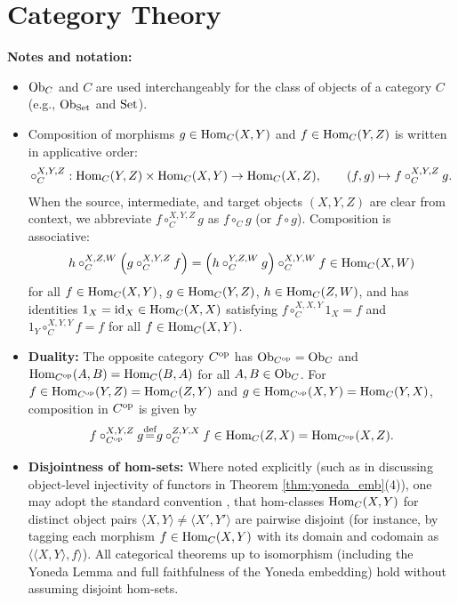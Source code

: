 \documentclass[10pt,a4paper]{article}
\begin{document}
\section{Category Theory}\label{sec:cat_theory}
\noindent\textbf{Notes and notation:}
\begin{itemize}
\item ${\textrm{Ob}}_C$ and $C$ are used interchangeably for the class of objects of a category $C$ (e.g., ${\textrm{Ob}}_{\textrm{Set}}$ and ${\textrm{Set}}$).
\item Composition of morphisms $g \in {\textrm{Hom}}_C(X,Y)$ and $f \in {\textrm{Hom}}_C(Y,Z)$ is written in applicative order:
$$\circ_C^{X,Y,Z} : {\textrm{Hom}}_C(Y,Z) \times {\textrm{Hom}}_C(X,Y) \to {\textrm{Hom}}_C(X,Z), \qquad (f, g) \mapsto f \circ_C^{X,Y,Z} g.$$
When the source, intermediate, and target objects $(X, Y, Z)$ are clear from context, we abbreviate $f \circ_C^{X,Y,Z} g$ as $f \circ_C g$ (or $f \circ g$). Composition is associative:
$$h \circ_C^{X,Z,W} \left(g \circ_C^{X,Y,Z} f\right) = \left(h \circ_C^{Y,Z,W} g\right) \circ_C^{X,Y,W} f \in {\textrm{Hom}}_C(X,W)$$
for all $f \in {\textrm{Hom}}_C(X,Y)$, $g \in {\textrm{Hom}}_C(Y,Z)$, $h \in {\textrm{Hom}}_C(Z,W)$, and has identities $1_X = {\textrm{id}}_X \in {\textrm{Hom}}_C(X,X)$ satisfying $f \circ_C^{X,X,Y} 1_X = f$ and $1_Y \circ_C^{X,Y,Y} f = f$ for all $f \in {\textrm{Hom}}_C(X,Y)$.
\item \textbf{Duality:} The opposite category $C^{\textrm{op}}$ has ${\textrm{Ob}}_{C^{\textrm{op}}} = {\textrm{Ob}}_C$ and ${\textrm{Hom}}_{C^{\textrm{op}}}(A,B) = {\textrm{Hom}}_C(B,A)$ for all $A,B \in {\textrm{Ob}}_C$. For $f \in {\textrm{Hom}}_{C^{\textrm{op}}}(Y,Z) = {\textrm{Hom}}_C(Z,Y)$ and $g \in {\textrm{Hom}}_{C^{\textrm{op}}}(X,Y) = {\textrm{Hom}}_C(Y,X)$, composition in $C^{\textrm{op}}$ is given by
$$f \circ_{C^{\textrm{op}}}^{X,Y,Z} g {\stackrel{{\textrm{def}}}{=}} g \circ_C^{Z,Y,X} f \in {\textrm{Hom}}_C(Z,X) = {\textrm{Hom}}_{C^{\textrm{op}}}(X,Z).$$
\item \textbf{Disjointness of hom-sets:} Where noted explicitly (such as in discussing object-level injectivity of functors in Theorem \ref{thm:yoneda_emb}(4)), one may adopt the standard convention \cite[Ch.~I, Sec.~8]{MacLane1998}, \cite[Sec.~1.1]{Riehl2016} that hom-classes ${\textrm{Hom}}_C(X, Y)$ for distinct object pairs $\langle X, Y \rangle \neq \langle X', Y' \rangle$ are pairwise disjoint (for instance, by tagging each morphism $f \in {\textrm{Hom}}_C(X, Y)$ with its domain and codomain as $\langle \langle X, Y \rangle, f \rangle$). All categorical theorems up to isomorphism (including the Yoneda Lemma and full faithfulness of the Yoneda embedding) hold without assuming disjoint hom-sets.
\end{itemize}
\end{document}
